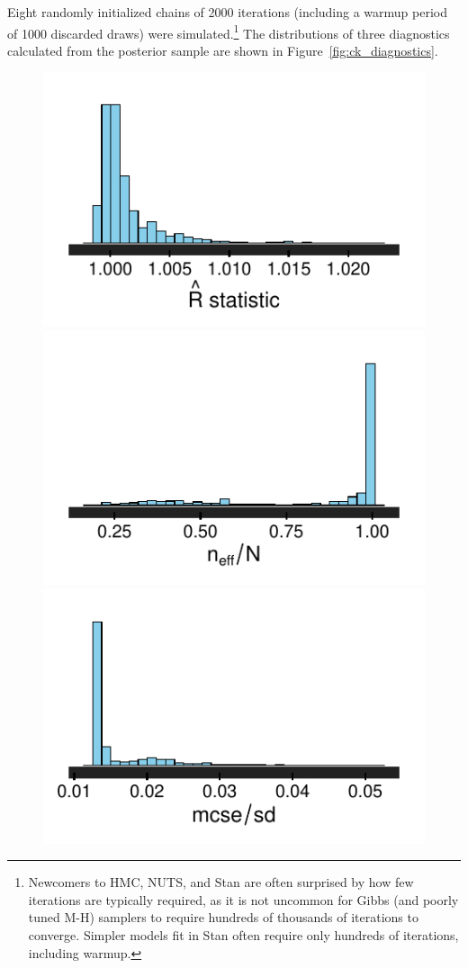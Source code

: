 Eight randomly initialized chains of 2000 iterations (including a warmup period of 1000 discarded draws) were simulated.\footnote{Newcomers to HMC, NUTS, and Stan are often surprised by how few iterations are typically required, as it is not uncommon for Gibbs (and poorly tuned M-H) samplers to require hundreds of thousands of iterations to converge. Simpler models fit in Stan often require only hundreds of iterations, including warmup.} The distributions of three diagnostics calculated from the posterior sample are shown in Figure~\ref{fig:ck_diagnostics}. 

\begin{figure}[t]
\centering
	\includegraphics[scale=0.7]{sections/figs/rhat}
	\includegraphics[scale=0.7]{sections/figs/neff}
	\includegraphics[scale=0.7]{sections/figs/mcse}

\end{figure}
